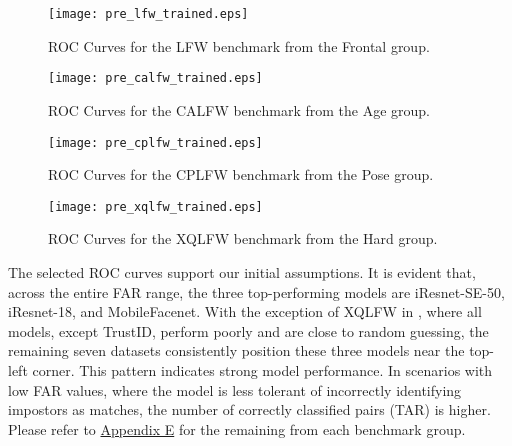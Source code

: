 \documentclass[class=report, crop=false, a4paper, 12pt]{standalone}
\begin{document}
\begin{figure}[H]
    \centering
    \begin{adjustbox}{center, minipage=1.1\textwidth, margin=0cm -0.1cm 0cm -0.1cm}  %
        \begin{minipage}[c]{0.49\textwidth}
            \centering
            \texttt{[image: pre\_lfw\_trained.eps]}
            \caption{ROC Curves for the LFW benchmark from the Frontal group.}
            \label{fig:roc_lfw}
        \end{minipage}
        \hfill
        \begin{minipage}[c]{0.49\textwidth}
            \centering
            \texttt{[image: pre\_calfw\_trained.eps]}
            \caption{ROC Curves for the CALFW benchmark from the Age group.}
            \label{fig:roc_calfw}
        \end{minipage}
    \end{adjustbox}
    \vspace{-0.4cm}
  \end{figure}
\vspace{-1cm}
\begin{figure}[H]
  \begin{adjustbox}{center, minipage=1.1\textwidth, margin=0cm -0.1cm 0cm -0.1cm}  %
      \begin{minipage}[c]{0.49\textwidth}
          \centering
          \texttt{[image: pre\_cplfw\_trained.eps]}
          \caption{ROC Curves for the CPLFW benchmark from the Pose group.}
          \label{fig:roc_cplfw}
      \end{minipage}
      \hfill
      \begin{minipage}[c]{0.49\textwidth}
          \centering
          \texttt{[image: pre\_xqlfw\_trained.eps]}
          \caption{ROC Curves for the XQLFW benchmark from the Hard group.}
          \label{fig:roc_xqlfw}
      \end{minipage}
  \end{adjustbox}
  \vspace{-0.4cm}
\end{figure}

\par The selected ROC curves support our initial assumptions. It is evident that, across the entire FAR range, the three top-performing models are iResnet-SE-50, iResnet-18, and MobileFacenet. With the exception of XQLFW in , where all models, except TrustID, perform poorly and are close to random guessing, the remaining seven datasets consistently position these three models near the top-left corner. This pattern indicates strong model performance. In scenarios with low FAR values, where the model is less tolerant of incorrectly identifying impostors as matches, the number of correctly classified pairs (TAR) is higher. Please refer to \hyperref[appendix:roc_curves_appendix]{Appendix E} for the remaining from each benchmark group.
\end{document}
